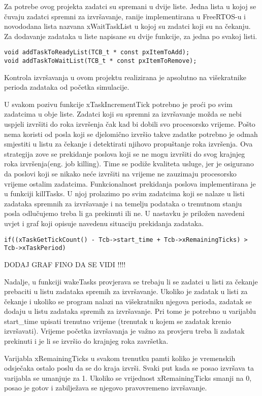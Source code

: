 \documentclass[../zavrsni.tex]{subfiles}
\begin{document}
Za potrebe ovog projekta zadatci su spremani u dvije liste. Jedna lista u kojoj se čuvaju zadatci spremni za izvršavanje, ranije 
implementirana u FreeRTOS-u i novododana lista nazvana xWaitTaskList u kojoj su zadatci koji su na čekanju. Za dodavanje zadataka u liste
napisane su dvije funkcije, za jedna po svakoj listi.

\begin{lstlisting}[style=CStyle,caption={Definicije funkcija za dodavanje zadataka u opisane liste},captionpos=b]
void addTaskToReadyList(TCB_t * const pxItemToAdd);
void addTaskToWaitList(TCB_t * const pxItemToRemove);
\end{lstlisting}

Kontrola izvršavanja u ovom projektu realizirana je apsolutno na višekratnike perioda zadataka od početka simulacije.

U svakom pozivu funkcije xTaskIncrementTick potrebno je proći po svim zadatcima u obje liste. Zadatci koji su spremni za izvršavanje
možda se nebi uspjeli izvršiti do roka izvršenja čak kad bi dobili svo procesorsko vrijeme. Pošto nema koristi od posla koji se
djelomično izvršio takve zadatke potrebno je odmah smjestiti u listu za čekanje i detektirati njihovo propuštanje roka izvršenja.
Ova strategija zove se prekidanje poslova koji se ne mogu izvršiti do svog krajnjeg roka izvršenja(eng. job killing). Time se
podiže kvaliteta usluge, jer je osigurano da poslovi koji se nikako neće izvršiti na vrijeme ne zauzimaju procesorsko vrijeme 
ostalim zadatcima. Funkcionalnost prekidanja poslova implementirana je u funkciji killTasks. U njoj prolazimo po svim zadatcima koji se 
nalaze u listi zadataka spremnih za izvršavanje i na temelju podataka o trenutnom stanju posla odlučujemo treba li ga prekinuti ili ne.
U nastavku je priložen navedeni uvjet i graf koji opisuje navedenu situaciju prekidanja zadataka.
\begin{lstlisting}[style=CStyle,caption={Uvjet za prekidanje izvođenja zadatka},captionpos=b]
if((xTaskGetTickCount() - Tcb->start_time + Tcb->xRemainingTicks) > 
Tcb->xTaskPeriod)
\end{lstlisting}

DODAJ GRAF FINO DA SE VIDI !!!!

Nadalje, u funkciji wakeTasks provjerava se trebaju li se zadatci u listi za čekanje prebaciti u listu zadataka spremih za izvršavanje.
Ukoliko je zadatak u listi za čekanje i ukoliko se program nalazi na višekratniku njegova perioda, zadatak se dodaju u listu 
zadataka spremih za izvršavanje. Pri tome je potrebno u varijablu start\_time upisati trenutno vrijeme (trenutak u kojem se zadatak 
krenio izvršavati). Vrijeme početka izvršavanja je važno za provjeru treba li zadatak prekinuti i je li se izvršio do krajnjeg roka 
završetka.

Varijabla xRemainingTicks u svakom trenutku pamti koliko je vremenskih odsječaka ostalo poslu da se do kraja izvrši. 
Svaki put kada se posao izvršava ta varijabla se umanjuje za 1. Ukoliko se vrijednost xRemainingTicks smanji na 0, 
posao je gotov i zabilježava se njegovo pravovremeno izvršavanje.
\end{document}
